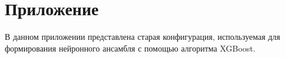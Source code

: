 \documentclass[14pt, a4paper]{src/bsu}
\begin{document}
\newpage

\titleformat{\section}[block]{\large\bfseries\filcenter}{}{0em}{}

\newpage

\printbibliography[heading=bibintoc,title={Список использованной литературы}]

\newpage

\appendix

\renewcommand{\chaptermark}[1]{\markboth{}{}}
\renewcommand{\sectionmark}[1]{\markright{\arabic{section}.\ #1}}

\titleformat{\section}[block]{\large\bfseries\filcenter}{}{0em}{}

 \label{sec:attachements}

\section{Приложение }
\label{subsec:old_polaris_learn_config}

В данном приложении представлена старая конфигурация, используемая для формирования нейронного ансамбля с помощью алгоритма XGBoost.


\end{document}
